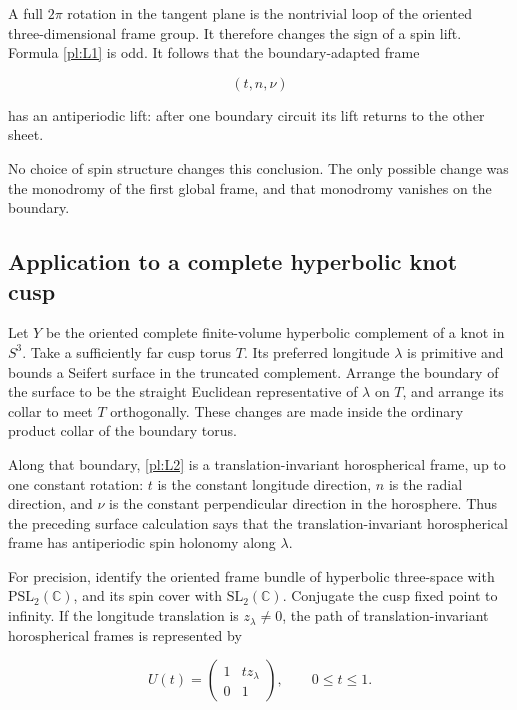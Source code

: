 A full \(2\pi\) rotation in the tangent plane is the nontrivial
loop of the oriented three-dimensional frame group. It therefore
changes the sign of a spin lift. Formula \eqref{pl:L1} is odd. It follows
that the boundary-adapted frame

\begin{equation}\label{pl:L2}
(t,n,\nu)
\end{equation}

has an antiperiodic lift: after one boundary circuit its lift
returns to the other sheet.

No choice of spin structure changes this conclusion. The only
possible change was the monodromy of the first global frame,
and that monodromy vanishes on the boundary.

\subsection{Application to a complete hyperbolic knot cusp}\label{pl:application-to-a-complete-hyperbolic-knot-cusp}

Let \(Y\) be the oriented complete finite-volume hyperbolic complement
of a knot in \(S^3\). Take a sufficiently far cusp torus \(T\).
Its preferred longitude \(\lambda\) is primitive and bounds
a Seifert surface in the truncated complement.
Arrange the boundary of the surface to be the straight Euclidean
representative of \(\lambda\) on \(T\), and arrange its
collar to meet \(T\) orthogonally. These changes are made
inside the ordinary product collar of the boundary torus.

Along that boundary, \eqref{pl:L2} is a translation-invariant horospherical frame, up to
one constant rotation: \(t\) is the constant longitude
direction, \(n\) is the radial direction, and \(\nu\)
is the constant perpendicular direction in the horosphere.
Thus the preceding surface calculation says that the translation-invariant horospherical frame has
antiperiodic spin holonomy along \(\lambda\).

For precision, identify the oriented frame bundle of hyperbolic
three-space with \(\mathrm{PSL}_2(\mathbb C)\), and its
spin cover with \(\mathrm{SL}_2(\mathbb C)\).
Conjugate the cusp fixed point to infinity. If the longitude
translation is \(z_\lambda\ne0\), the path of translation-invariant
horospherical frames is represented by

\begin{equation}\label{pl:L3}
U(t)=
 \begin{pmatrix}1&t z_\lambda\\0&1\end{pmatrix},
                         \qquad 0\le t\le1.
\end{equation}

